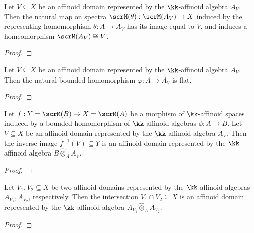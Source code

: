 
    
    \begin{proposition}\label{prop:spectrum_of_affinoid_algebra_represent_affinoid_domain}
        Let \(V \subseteq X\) be an affinoid domain represented by the \(\kk\)-affinoid algebra \(A_V\).
        Then the natural map on spectra \(\scrM(\theta): \scrM(A_V) \to X\) induced by the representing homomorphism \(\theta: A \to A_V\) has its image equal to \(V\), and induces a homeomorphism \(\scrM(A_V) \cong V\).
    \end{proposition}
    \begin{proof}
    \end{proof}

    \begin{proposition}\label{prop:affinoid_domain_is_flat_over_base}
        Let \(V \subseteq X\) be an affinoid domain represented by the \(\kk\)-affinoid algebra \(A_V\).
        Then the natural bounded homomorphism \(\varphi: A \to A_V\) is flat.
    \end{proposition}
    \begin{proof}
    \end{proof}

    \begin{proposition}\label{prop:inverse_image_of_affinoid_domain}
        Let \(f: Y=\scrM(B) \to X = \scrM(A)\) be a morphism of \(\kk\)-affinoid spaces induced by a bounded homomorphism of \(\kk\)-affinoid algebras \(\phi: A \to B\).
        Let \(V \subseteq X\) be an affinoid domain represented by the \(\kk\)-affinoid algebra \(A_V\).
        Then the inverse image \(f^{-1}(V) \subseteq Y\) is an affinoid domain represented by the \(\kk\)-affinoid algebra \(B \hat{\otimes}_A A_V\).
    \end{proposition}
    \begin{proof}
    \end{proof}

    \begin{proposition}\label{prop:intersection_of_affinoid_domain}
        Let \(V_1,V_2 \subseteq X\) be two affinoid domains represented by the \(\kk\)-affinoid algebras \(A_{V_1}, A_{V_2}\), respectively.
        Then the intersection \(V_1 \cap V_2 \subseteq X\) is an affinoid domain represented by the \(\kk\)-affinoid algebra \(A_{V_1} \hat{\otimes}_A A_{V_2}\).
    \end{proposition}
    \begin{proof}
    \end{proof}


